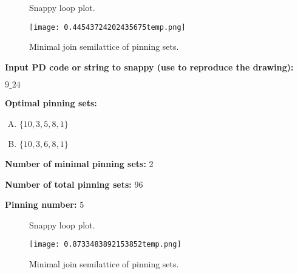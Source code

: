 \documentclass{article}%
\begin{document}
\begin{multicols}{2}
\begin{figure}[H]
\centering

\caption{Snappy loop plot.}
\label{fig:0.059595597409091594temp.svg}
\end{figure}\columnbreak

\begin{figure}[H]
\centering
\texttt{[image: 0.44543724202435675temp.png]}
\caption{Minimal join semilattice of pinning sets.}
\label{fig:0.44543724202435675temp.png}
\end{figure}\end{multicols}\newpage\begin{multicols}{2}

\columnbreak

\noindent\textbf{Input PD code or string to snappy (use to reproduce the drawing):}

	$9\_24$

\noindent\textbf{Optimal pinning sets:}

\begin{enumerate}[A)]
\item{\Huge\textcolor{green0}{\textbullet}}$\{10,3,5,8,1\}$

\item{\Huge\textcolor{green1}{\textbullet}}$\{10,3,6,8,1\}$

\end{enumerate}


\noindent\textbf{Number of minimal pinning sets:} 2

\noindent\textbf{Number of total pinning sets:} 96

\noindent\textbf{Pinning number:} 5


\end{multicols}

\begin{multicols}{2}
\begin{figure}[H]
\centering

\caption{Snappy loop plot.}
\label{fig:0.6492697324530691temp.svg}
\end{figure}\columnbreak

\begin{figure}[H]
\centering
\texttt{[image: 0.8733483892153852temp.png]}
\caption{Minimal join semilattice of pinning sets.}
\label{fig:0.8733483892153852temp.png}
\end{figure}\end{multicols}\newpage
\end{document}
